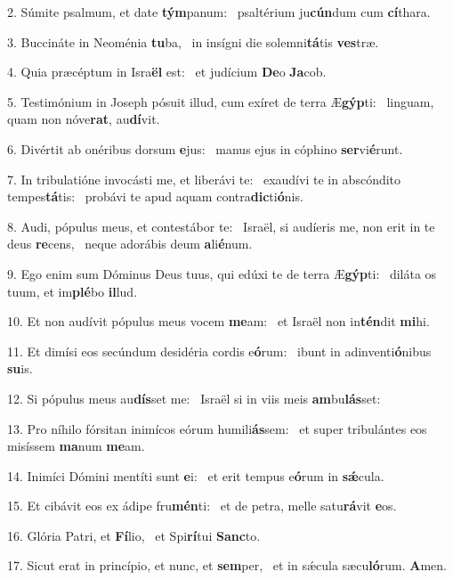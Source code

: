2. Súmite psalmum, et date \textbf{tým}panum: \ast\  psaltérium ju\textbf{cún}dum cum \textbf{cí}thara.\

3. Buccináte in Neoménia \textbf{tu}ba, \ast\  in insígni die solemni\textbf{tá}tis \textbf{ves}træ.\

4. Quia præcéptum in Isra\textbf{ël} est: \ast\  et judícium \textbf{De}o \textbf{Ja}cob.\

5. Testimónium in Joseph pósuit illud, cum exíret de terra Æ\textbf{gýp}ti: \ast\  linguam, quam non nóve\textbf{rat}, au\textbf{dí}vit.\

6. Divértit ab onéribus dorsum \textbf{e}jus: \ast\  manus ejus in cóphino \textbf{ser}vi\textbf{é}runt.\

7. In tribulatióne invocásti me, et liberávi te: \dag\  exaudívi te in abscóndito tempes\textbf{tá}tis: \ast\  probávi te apud aquam contra\textbf{dic}ti\textbf{ó}nis.\

8. Audi, pópulus meus, et contestábor te: \dag\  Israël, si audíeris me, non erit in te deus \textbf{re}cens, \ast\  neque adorábis deum \textbf{a}li\textbf{é}num.\

9. Ego enim sum Dóminus Deus tuus, qui edúxi te de terra Æ\textbf{gýp}ti: \ast\  diláta os tuum, et im\textbf{plé}bo \textbf{il}lud.\

10. Et non audívit pópulus meus vocem \textbf{me}am: \ast\  et Israël non in\textbf{tén}dit \textbf{mi}hi.\

11. Et dimísi eos secúndum desidéria cordis e\textbf{ó}rum: \ast\  ibunt in adinventi\textbf{ó}nibus \textbf{su}is.\

12. Si pópulus meus au\textbf{dís}set me: \ast\  Israël si in viis meis \textbf{am}bu\textbf{lás}set:\

13. Pro níhilo fórsitan inimícos eórum humili\textbf{ás}sem: \ast\  et super tribulántes eos misíssem \textbf{ma}num \textbf{me}am.\

14. Inimíci Dómini mentíti sunt \textbf{e}i: \ast\  et erit tempus e\textbf{ó}rum in \textbf{sǽ}cula.\

15. Et cibávit eos ex ádipe fru\textbf{mén}ti: \ast\  et de petra, melle satu\textbf{rá}vit \textbf{e}os.\

16. Glória Patri, et \textbf{Fí}lio, \ast\  et Spi\textbf{rí}tui \textbf{Sanc}to.\

17. Sicut erat in princípio, et nunc, et \textbf{sem}per, \ast\  et in sǽcula sæcu\textbf{ló}rum. \textbf{A}men.\

